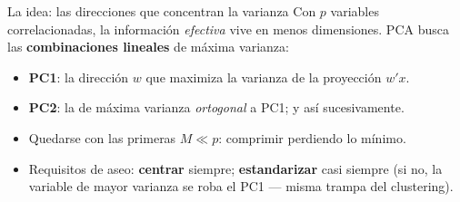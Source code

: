 \documentclass{beamer}
\newcommand{\1}{\mathbb{I}}
\begin{document}
\begin{frame}{La idea: las direcciones que concentran la varianza}
\small
Con $p$ variables correlacionadas, la información \emph{efectiva} vive en menos dimensiones. PCA busca las \textbf{combinaciones lineales} de máxima varianza:

\vspace{0.15cm}
\begin{center}
\end{center}
\pause

\begin{itemize}\itemsep4pt
  \item \textbf{PC1}: la dirección $w$ que maximiza la varianza de la proyección $w'x$.
  \item \textbf{PC2}: la de máxima varianza \emph{ortogonal} a PC1; y así sucesivamente.
  \item Quedarse con las primeras $M \ll p$: comprimir perdiendo lo mínimo. \pause
  \item Requisitos de aseo: \textbf{centrar} siempre; \textbf{estandarizar} casi siempre (si no, la variable de mayor varianza se roba el PC1 --- misma trampa del clustering).
\end{itemize}
\end{frame}
\end{document}
